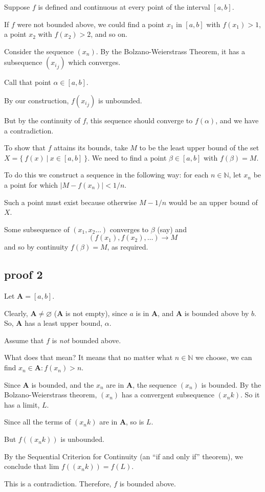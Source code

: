 \documentclass[11pt, oneside]{article}
\begin{document}
Suppose $f$ is defined and continuous at every point of the interval $[a,b]$.

If $f$ were not bounded above, we could find a point $x_1$ in $[a,b]$ with $f(x_1) > 1$, a point $x_2$ with $f(x_2) > 2$, and so on.

Consider the sequence $(x_n)$.  By the Bolzano-Weierstrass Theorem, it has a subsequence $({x_i}_j)$ which converges.  

Call that point $\alpha \in [a,b]$.

By our construction, $f({x_i}_j)$ is unbounded.

But by the continuity of $f$, this sequence should converge to $f(\alpha)$, and we have a contradiction.

To show that $f$ attains its bounds, take $M$ to be the least upper bound of the set $X = \{ \ f(x) \ | \ x \in [a,b] \ \}$.  We need to find a point $\beta \in [a,b]$ with $f(\beta) = M$. 

To do this we construct a sequence in the following way:  for each $n \in \mathbb{N}$, let $x_n$ be a point for which $|M - f(x_n)| < 1/n$.

Such a point must exist because otherwise $M - 1/n$ would be an upper bound of $X$.  

Some subsequence of $(x_1, x_2 \dots)$ converges to $\beta$ (say) and 
\[ (f(x_1), f(x_2), \dots) \rightarrow M \]
and so by continuity $f(\beta) = M$, as required.

\subsection*{proof 2}
Let $\mathbf{A} = [a,b]$.

Clearly, $\mathbf{A} \ne \varnothing$ ($\mathbf{A}$ is not empty), since $a$ is in $\mathbf{A}$, and $\mathbf{A}$ is bounded above by $b$.  So, $\mathbf{A}$ has a least upper bound, $\alpha$.

Assume that $f$ is \emph{not} bounded above.

What does that mean?  It means that no matter what $n \in \mathbb{N}$ we choose, we can find $x_n \in \mathbf{A}: f(x_n) > n$.

Since $\mathbf{A}$ is bounded, and the $x_n$ are in $\mathbf{A}$, the sequence $(x_n)$ is bounded.  By the Bolzano-Weierstrass theorem, $(x_n)$ has a convergent subsequence $(x_nk)$.  So it has a limit, $L$.

Since all the terms of $(x_nk)$ are in $\mathbf{A}$, so is $L$.

But $f((x_nk))$ is unbounded.

By the Sequential Criterion for Continuity (an “if and only if” theorem), we conclude that lim $f((x_nk)) = f(L)$.

This is a contradiction.  Therefore, $f$ is bounded above.
\end{document}
